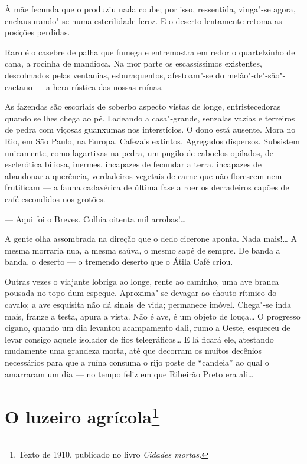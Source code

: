 À mãe fecunda que o produziu nada coube; por isso, ressentida, vinga"-se
agora, enclausurando"-se numa esterilidade feroz. E o deserto lentamente
retoma as posições perdidas.

Raro é o casebre de palha que fumega e entremostra em redor o
quartelzinho de cana, a rocinha de mandioca. Na mor parte os
escassíssimos existentes, descolmados pelas ventanias, esburaquentos,
afestoam"-se do melão"-de"-são"-caetano --- a hera rústica das nossas
ruínas.

As fazendas são escoriais de soberbo aspecto vistas de longe,
entristecedoras quando se lhes chega ao pé. Ladeando a casa"-grande,
senzalas vazias e terreiros de pedra com viçosas guanxumas nos
interstícios. O dono está ausente. Mora no Rio, em São Paulo, na Europa.
Cafezais extintos. Agregados dispersos. Subsistem unicamente, como
lagartixas na pedra, um pugilo de caboclos opilados, de esclerótica
biliosa, inermes, incapazes de fecundar a terra, incapazes de abandonar
a querência, verdadeiros vegetais de carne que não florescem nem
frutificam --- a fauna cadavérica de última fase a roer os derradeiros
capões de café escondidos nos grotões.

--- Aqui foi o Breves. Colhia oitenta mil arrobas!\ldots{}

A gente olha assombrada na direção que o dedo cicerone aponta. Nada
mais!\ldots{} A mesma morraria nua, a mesma saúva, o mesmo sapé de sempre. De
banda a banda, o deserto --- o tremendo deserto que o Átila Café criou.

Outras vezes o viajante lobriga ao longe, rente ao caminho, uma ave
branca pousada no topo dum espeque. Aproxima"-se devagar ao chouto
rítmico do cavalo; a ave esquisita não dá sinais de vida; permanece
imóvel. Chega"-se inda mais, franze a testa, apura a vista. Não é ave, é
um objeto de louça\ldots{} O progresso cigano, quando um dia levantou
acampamento dali, rumo a Oeste, esqueceu de levar consigo aquele
isolador de fios telegráficos\ldots{} E lá ficará ele, atestando mudamente
uma grandeza morta, até que decorram os muitos decênios necessários para
que a ruína consuma o rijo poste de ``candeia'' ao qual o amarraram um
dia --- no tempo feliz em que Ribeirão Preto era ali\ldots{}

\chapter{O luzeiro agrícola\footnote[*]{Texto de 1910, publicado no livro \emph{Cidades mortas}.}}

